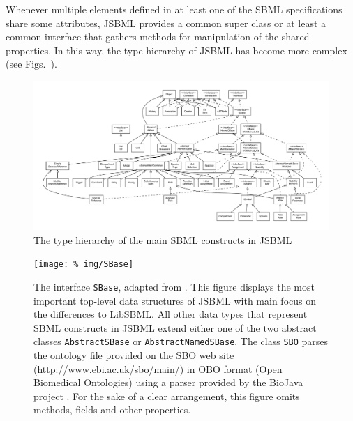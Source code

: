 \documentclass[
  BCOR12mm,
  letterpaper,
  11pt,
  headsepline,
  pointlessnumbers,
  tablecaptionabove,
  onelinecaption,
  headinclude,
  appendixprefix,
  idxtotoc,
  bibtotoc,
  twoside,
  titlepage
]{scrartcl}
\begin{document}
Whenever multiple elements defined in at least one of the SBML specifications \citep{Hucka2003, Hucka2008, Hucka2010a} share some
attributes, JSBML provides a common super class or at least a common interface
that gathers methods for manipulation of the shared properties. In this way, the
type hierarchy of JSBML has become more complex (see
Figs.~).
\begin{figure}
\centering
\includegraphics[width=\textwidth]{img/FullTypeHierarchy}
\caption[The type hierarchy in JSBML]{The type hierarchy of the main SBML
constructs in JSBML}
\label{fig:TypeHierarchy}
\end{figure}
\begin{figure}[htb]
 \centering
 \texttt{[image: \%
img/SBase]}
 \caption[The interface \texttt{SBase}]{The interface \texttt{SBase}, adapted
from \citep{Draeger2011}. This figure displays the most important top-level data
structures of JSBML with main focus on the differences to LibSBML. All other
data types that represent SBML constructs in JSBML extend either one of the two
abstract classes \texttt{AbstractSBase} or \texttt{AbstractNamedSBase}. The
class \texttt{SBO} parses the ontology file provided on the SBO web
site (\url{http://www.ebi.ac.uk/sbo/main/}) in OBO format (Open
Biomedical Ontologies) using a parser provided by the BioJava project
\citep{Holland2008}. For the sake of a clear arrangement, this figure omits
methods, fields and other properties.}
 \label{fig:SBase}
\end{figure}
\end{document}
